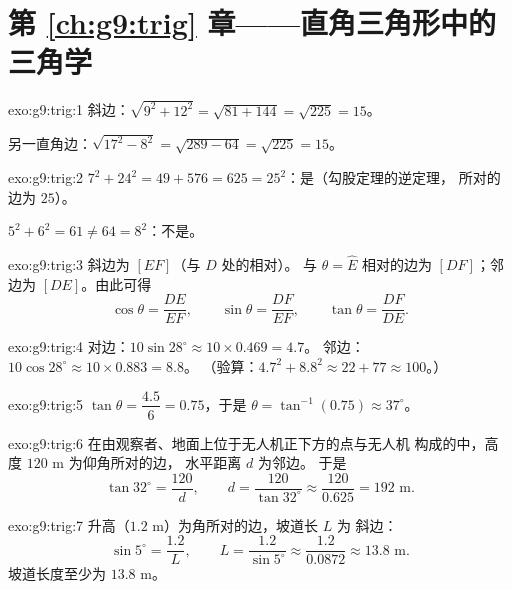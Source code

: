 \section*{第 \ref{ch:g9:trig} 章——直角三角形中的三角学}

\begin{solution}{exo:g9:trig:1}
斜边：$\sqrt{9^2 + 12^2} = \sqrt{81 + 144} = \sqrt{225} = 15$。

另一直角边：$\sqrt{17^2 - 8^2} = \sqrt{289 - 64} = \sqrt{225} = 15$。
\end{solution}

\begin{solution}{exo:g9:trig:2}
$7^2 + 24^2 = 49 + 576 = 625 = 25^2$：是（勾股定理的逆定理，
所对的边为 $25$）。

$5^2 + 6^2 = 61 \neq 64 = 8^2$：不是。
\end{solution}

\begin{solution}{exo:g9:trig:3}
斜边为 $[EF]$（与 $D$ 处的相对）。
与 $\theta = \widehat E$ 相对的边为 $[DF]$；邻边为
$[DE]$。由此可得
\[
\cos\theta = \frac{DE}{EF}, \qquad
\sin\theta = \frac{DF}{EF}, \qquad
\tan\theta = \frac{DF}{DE}.
\]
\end{solution}

\begin{solution}{exo:g9:trig:4}
对边：$10 \sin 28^\circ \approx 10 \times 0.469 = 4.7$。
邻边：$10 \cos 28^\circ \approx 10 \times 0.883 = 8.8$。
（验算：$4.7^2 + 8.8^2 \approx 22 + 77 \approx 100$。）
\end{solution}

\begin{solution}{exo:g9:trig:5}
$\tan\theta = \dfrac{4.5}{6} = 0.75$，于是
$\theta = \tan^{-1}(0.75) \approx 37^\circ$。
\end{solution}

\begin{solution}{exo:g9:trig:6}
在由观察者、地面上位于无人机正下方的点与无人机
构成的中，高度 $120$ m 为仰角所对的边，
水平距离 $d$ 为邻边。
于是
\[
\tan 32^\circ = \frac{120}{d},
\qquad
d = \frac{120}{\tan 32^\circ} \approx \frac{120}{0.625} = 192 \text{ m}.
\]
\end{solution}

\begin{solution}{exo:g9:trig:7}
升高（$1.2$ m）为角所对的边，坡道长 $L$ 为
斜边：
\[
\sin 5^\circ = \frac{1.2}{L},
\qquad
L = \frac{1.2}{\sin 5^\circ} \approx \frac{1.2}{0.0872} \approx 13.8
\text{ m}.
\]
坡道长度至少为 $13.8$ m。
\end{solution}

